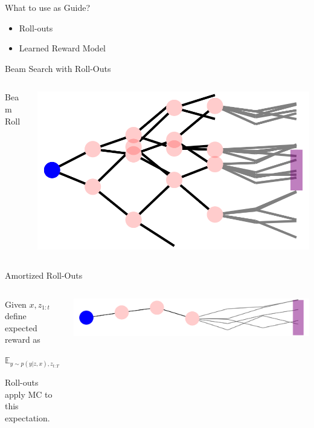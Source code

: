 \documentclass[14pt,aspectratio=169]{beamer}
\begin{document}
\begin{frame}{What to use as Guide?}
	\begin{itemize}
		\item Roll-outs
		\item Learned Reward Model
	\end{itemize}
\end{frame}


\begin{frame}{Beam Search with Roll-Outs}
	\begin{columns}
		\begin{column}{0.5\linewidth}
			Beam Roll
		\end{column}
		\begin{column}{0.5\linewidth}
			\includegraphics[width=\textwidth]{images/beamroll.png}
		\end{column}
	\end{columns}
\end{frame}


\begin{frame}{Amortized Roll-Outs}
	\begin{columns}
		\begin{column}{0.5\linewidth}
			Given $x, z_{1:t}$ define expected reward as

			$\mathbb{E}_{y\sim p(y| z, x), z_{t:T} \sim p(z | z_{1:t}, x)}[Ver(y)]$

			Roll-outs apply MC to this expectation.
		\end{column}
		\begin{column}{0.5\linewidth}
			\includegraphics[width=\textwidth]{images/mcroll.png}
		\end{column}
	\end{columns}
\end{frame}
\end{document}
